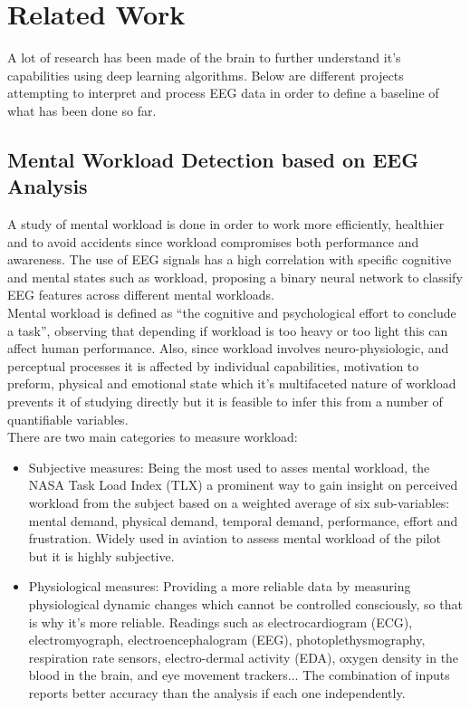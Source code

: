 \section{Related Work}
\label{sec-related-work}
A lot of research has been made of the brain to further understand it’s capabilities using deep learning algorithms. Below are different projects attempting to interpret and process EEG data in order to define a baseline of what has been done so far. 
\\
\subsection{Mental Workload Detection based on EEG Analysis}
\label{subsec-work1}
A study of mental workload\cite{wrokload} is done in order to work more efficiently, healthier and to avoid accidents since workload compromises both performance and awareness. The use of EEG signals has a high correlation with specific cognitive and mental states such as workload, proposing a binary neural network to classify EEG features across different mental workloads.
\\
Mental workload is defined as “the cognitive and psychological effort to conclude a task”, observing that depending if workload is too heavy or too light this can affect human performance. Also, since workload involves neuro-physiologic, and perceptual processes it is affected by individual capabilities, motivation to preform, physical and emotional state which it’s multifaceted nature of workload prevents it of studying directly but it is feasible to infer this from a number of quantifiable variables.
\\
There are two main categories to measure workload:
\\
\begin{itemize}
\item Subjective measures: Being the most used to asses mental workload, the NASA Task Load Index (TLX) a prominent way to gain insight on perceived workload from the subject based on a weighted average of six sub-variables: mental demand, physical demand, temporal demand, performance, effort and frustration. Widely used in aviation to assess mental workload of the pilot but it is highly subjective.
\item Physiological measures: Providing a more reliable data by measuring physiological dynamic changes which cannot be controlled consciously, so that is why it’s more reliable. Readings such as electrocardiogram (ECG), electromyograph, electroencephalogram (EEG), photoplethysmography, respiration rate sensors, electro-dermal activity (EDA), oxygen density in the blood in the brain, and eye movement trackers... The combination of inputs reports better accuracy than the analysis if each one independently.
\end{itemize}

